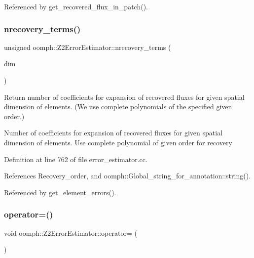 Referenced by get\+\_\+recovered\+\_\+flux\+\_\+in\+\_\+patch().

\mbox{\label{classoomph_1_1Z2ErrorEstimator_a1782984fa64738f9a8e7ca40d585597a}} 
\subsubsection{\texorpdfstring{nrecovery\+\_\+terms()}{nrecovery\_terms()}}
{\footnotesize\ttfamily unsigned oomph\+::\+Z2\+Error\+Estimator\+::nrecovery\+\_\+terms (\begin{DoxyParamCaption}\item[{const unsigned \&}]{dim }\end{DoxyParamCaption})\hspace{0.3cm}{\ttfamily [private]}}



Return number of coefficients for expansion of recovered fluxes for given spatial dimension of elements. (We use complete polynomials of the specified given order.) 

Number of coefficients for expansion of recovered fluxes for given spatial dimension of elements. Use complete polynomial of given order for recovery 

Definition at line 762 of file error\+\_\+estimator.\+cc.



References Recovery\+\_\+order, and oomph\+::\+Global\+\_\+string\+\_\+for\+\_\+annotation\+::string().



Referenced by get\+\_\+element\+\_\+errors().

\mbox{\label{classoomph_1_1Z2ErrorEstimator_a192eb7456b2174118b377bb74951dddf}} 
\subsubsection{\texorpdfstring{operator=()}{operator=()}}
{\footnotesize\ttfamily void oomph\+::\+Z2\+Error\+Estimator\+::operator= (\begin{DoxyParamCaption}\item[{const \hyperlink{classoomph_1_1Z2ErrorEstimator}{Z2\+Error\+Estimator} \&}]{ }\end{DoxyParamCaption})\hspace{0.3cm}{\ttfamily [inline]}}



